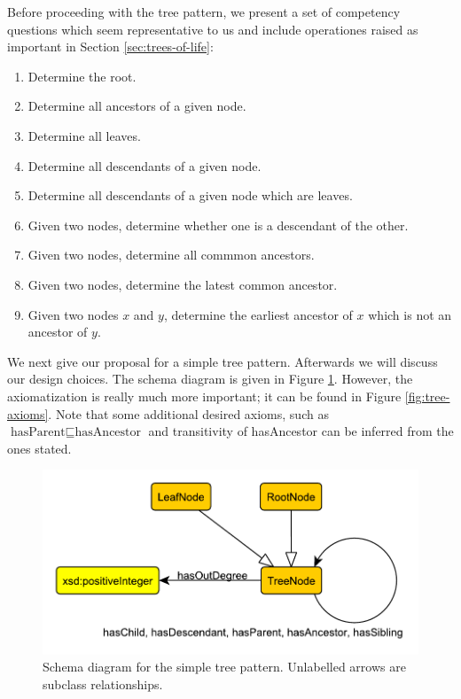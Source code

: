 Before proceeding with the tree pattern, we present a set of competency questions \cite{chess-odp-book} which seem representative to us and include operationes raised as important in Section \ref{sec:trees-of-life}:
\begin{enumerate}
\item\label{cq1} Determine the root.
\item\label{cq2}  Determine all ancestors of a given node.
\item\label{cq3}  Determine all leaves.
\item\label{cq4}  Determine all descendants of a given node.
\item\label{cq5}  Determine all descendants of a given node which are leaves.
\item\label{cq6}  Given two nodes, determine whether one is a descendant of the other. 
\item\label{cq7} Given two nodes, determine all commmon ancestors.
\item\label{cq8}  Given two nodes, determine the latest common ancestor.
\item\label{cq9}  Given two nodes $x$ and $y$, determine the earliest ancestor of $x$ which is not an ancestor of $y$.
\end{enumerate}

We next give our proposal for a simple tree pattern. Afterwards we will discuss our design choices. The schema diagram is given in Figure \ref{fig:tree}. However, the axiomatization is really much more important; it can be found in Figure \ref{fig:tree-axioms}. Note that some additional desired axioms, such as $\text{hasParent} \sqsubseteq \text{hasAncestor}$ and transitivity of hasAncestor can be inferred from the ones stated.

\begin{figure}[t]
\begin{center}
\includegraphics[width=.6\textwidth]{tree-schema}
\end{center}
\caption{Schema diagram for the simple tree pattern. Unlabelled arrows are subclass relationships.}\label{fig:tree}
\end{figure}

